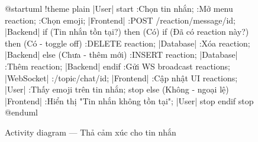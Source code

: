 \documentclass[12pt,a4paper]{report}
\begin{document}
\begin{figure}[H]
    \centering
    \begin{plantuml}
        @startuml
        !theme plain
        |User|
        start
        :Chọn tin nhắn;
        :Mở menu reaction;
        :Chọn emoji;
        |Frontend|
        :POST /reaction/message/{id};
        |Backend|
        if (Tin nhắn tồn tại?) then (Có)
          if (Đã có reaction này?) then (Có - toggle off)
            :DELETE reaction;
            |Database|
            :Xóa reaction;
            |Backend|
          else (Chưa - thêm mới)
            :INSERT reaction;
            |Database|
            :Thêm reaction;
            |Backend|
          endif
          :Gửi WS broadcast reactions;
          |WebSocket|
          :/topic/chat/{id};
          |Frontend|
          :Cập nhật UI reactions;
          |User|
          :Thấy emoji trên tin nhắn;
          stop
        else (Không - ngoại lệ)
          |Frontend|
          :Hiển thị "Tin nhắn không tồn tại";
          |User|
          stop
        endif
        stop
        @enduml
    \end{plantuml}
    \caption{Activity diagram --- Thả cảm xúc cho tin nhắn}
\end{figure}
\end{document}
